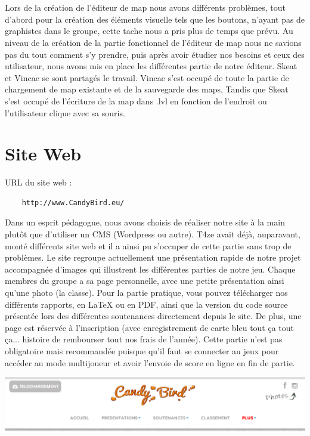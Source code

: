\documentclass [11pt]{report}
\begin{document}
	 \\
	 \\
	 \newpage
	 \indent Lors de la création de l'éditeur de map nous avons différents problèmes, tout d'abord pour la création des éléments visuelle tels que les boutons, n'ayant pas de graphistes dans le groupe, cette tache nous a pris plus de temps que prévu. Au niveau de la création de la partie fonctionnel de l'éditeur de map nous ne savions pas du tout comment s'y prendre, puis après avoir étudier nos besoins et ceux des utilisateur, nous avons mis en place les différentes partie de notre éditeur. Skeat et Vincae se sont partagés le travail. Vincae s'est occupé de toute la partie de chargement de map existante et de la sauvegarde des maps, Tandis que Skeat s'est occupé de l'écriture de la map dans .lvl en fonction de l'endroit ou l'utilisateur clique avec sa souris.\\
	 
	 
	\section{Site Web}
	
	URL du site web : 
	\begin{Verbatim}
	http://www.CandyBird.eu/
	\end{Verbatim}
	
	Dans un esprit pédagogue, nous avons choisis de réaliser notre site à la main plutôt que d'utiliser un CMS (Wordpress ou autre). T4ze avait déjà, auparavant, monté différents site web et il a ainsi pu s'occuper de cette partie sans trop de problèmes. Le site regroupe actuellement une présentation rapide de notre projet accompagnée d'images qui illustrent les différentes parties de notre jeu. Chaque membres du groupe a sa page personnelle, avec une petite présentation ainsi qu'une photo (la classe). Pour la partie pratique, vous pouvez télécharger nos différents rapports, en LaTeX ou en PDF, ainsi que la version du code source présentée lors des différentes soutenances directement depuis le site. De plus, une page est réservée à l'inscription (avec enregistrement de carte bleu tout ça tout ça... histoire de rembourser tout nos frais de l'année). Cette partie n'est pas obligatoire mais recommandée puisque qu'il faut se connecter au jeux pour accéder au mode multijoueur et avoir l'envoie de score en ligne en fin de partie.\\
	\vspace{4mm}
	\begin{center}
	\includegraphics[scale=0.5]{images/site.png}
	\end{center}
	
\end{document}
